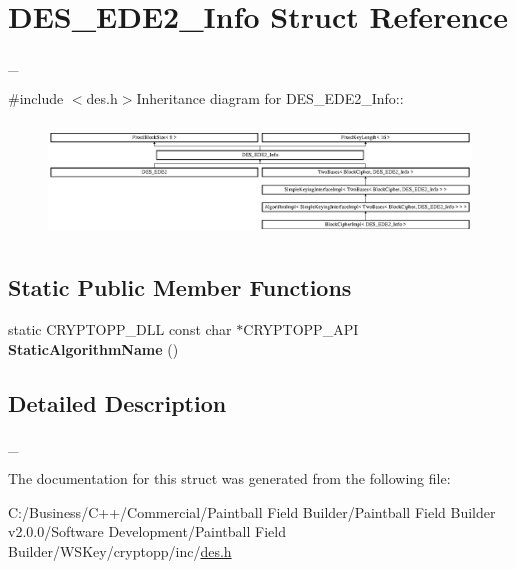 \hypertarget{struct_d_e_s___e_d_e2___info}{
\section{DES\_\-EDE2\_\-Info Struct Reference}
\label{struct_d_e_s___e_d_e2___info}
}


\_\-  


{\ttfamily \#include $<$des.h$>$}Inheritance diagram for DES\_\-EDE2\_\-Info::\begin{figure}[H]
\begin{center}
\leavevmode
\includegraphics[height=3.09963cm]{struct_d_e_s___e_d_e2___info}
\end{center}
\end{figure}
\subsection*{Static Public Member Functions}
\begin{DoxyCompactItemize}
\item 
\hypertarget{struct_d_e_s___e_d_e2___info_abf5d8fdf72f0e0186edf15748c1f9d09}{
static CRYPTOPP\_\-DLL const char $\ast$CRYPTOPP\_\-API {\bfseries StaticAlgorithmName} ()}
\label{struct_d_e_s___e_d_e2___info_abf5d8fdf72f0e0186edf15748c1f9d09}

\end{DoxyCompactItemize}


\subsection{Detailed Description}
\_\- 

The documentation for this struct was generated from the following file:\begin{DoxyCompactItemize}
\item 
C:/Business/C++/Commercial/Paintball Field Builder/Paintball Field Builder v2.0.0/Software Development/Paintball Field Builder/WSKey/cryptopp/inc/\hyperlink{des_8h}{des.h}\end{DoxyCompactItemize}
